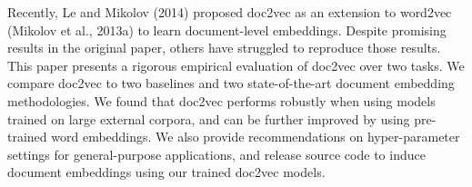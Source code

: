 Recently, Le and Mikolov (2014) proposed doc2vec as an extension to word2vec (Mikolov et al., 2013a) to learn document-level embeddings. Despite promising results in the original paper, others have struggled to reproduce those results. This paper presents a rigorous empirical evaluation of doc2vec over two tasks. We compare doc2vec to two baselines and two state-of-the-art document embedding methodologies. We found that doc2vec performs robustly when using models trained on large external corpora, and can be further improved by using pre-trained word embeddings. We also provide recommendations on hyper-parameter settings for general-purpose applications, and release source code to induce document embeddings using our trained doc2vec models.
